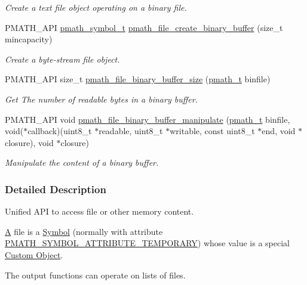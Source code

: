 \begin{CompactItemize}
\begin{CompactList}\small\item\em Create a text file object operating on a binary file. \item\end{CompactList}\item 
PMATH\_\-API \hyperlink{classpmath__symbol__t}{pmath\_\-symbol\_\-t} \hyperlink{group__file__api_g811d829fe964ebbe554c645a0f0f519d}{pmath\_\-file\_\-create\_\-binary\_\-buffer} (size\_\-t mincapacity)
\begin{CompactList}\small\item\em Create a byte-stream file object. \item\end{CompactList}\item 
PMATH\_\-API size\_\-t \hyperlink{group__file__api_gaa064ada946d36bf41ed9908d8176360}{pmath\_\-file\_\-binary\_\-buffer\_\-size} (\hyperlink{classpmath__t}{pmath\_\-t} binfile)
\begin{CompactList}\small\item\em Get The number of readable bytes in a binary buffer. \item\end{CompactList}\item 
PMATH\_\-API void \hyperlink{group__file__api_g9c684b801f150b0485c850cf3649cb16}{pmath\_\-file\_\-binary\_\-buffer\_\-manipulate} (\hyperlink{classpmath__t}{pmath\_\-t} binfile, void($\ast$callback)(uint8\_\-t $\ast$readable, uint8\_\-t $\ast$writable, const uint8\_\-t $\ast$end, void $\ast$closure), void $\ast$closure)
\begin{CompactList}\small\item\em Manipulate the content of a binary buffer. \item\end{CompactList}\end{CompactItemize}


\subsubsection{Detailed Description}
Unified API to access file or other memory content. 

\hyperlink{class_a}{A} file is a \hyperlink{group__symbols}{Symbol} (normally with attribute \hyperlink{group__symbols_g5d508ec0d32d617b6c642de54907ee17}{PMATH\_\-SYMBOL\_\-ATTRIBUTE\_\-TEMPORARY}) whose value is a special \hyperlink{group__custom}{Custom Object}.

The output functions can operate on lists of files. 

